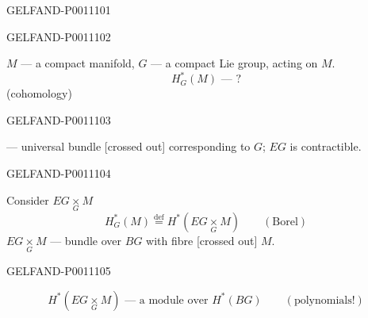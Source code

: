 \begin{GelfandAdjacentEvidence}{GELFAND-P001110}{1}
\end{GelfandAdjacentEvidence}
\begin{GelfandAdjacentEvidence}{GELFAND-P001110}{2}

$M$ — a compact manifold, $G$ — a compact Lie group, acting on $M$.
\[
H_G^*(M)\text{ — ?}
\]
(cohomology)

\end{GelfandAdjacentEvidence}
\begin{GelfandAdjacentEvidence}{GELFAND-P001110}{3}

— universal bundle [crossed out] corresponding to $G$; $EG$ is contractible.
\end{GelfandAdjacentEvidence}
\begin{GelfandAdjacentEvidence}{GELFAND-P001110}{4}


Consider $EG\underset G\times M$
\[
H_G^*(M)\overset{\mathrm{def}}=H^*(EG\underset G\times M)
\qquad(\text{Borel})
\]
$EG\underset G\times M$ — bundle over $BG$ with fibre [crossed out] $M$.
\end{GelfandAdjacentEvidence}
\begin{GelfandAdjacentEvidence}{GELFAND-P001110}{5}


\[
H^*(EG\underset G\times M)\text{ — a module over }
H^*(BG)\qquad(\text{polynomials!})
\]
\end{GelfandAdjacentEvidence}
